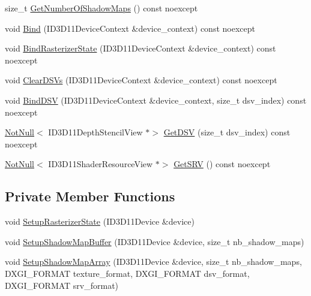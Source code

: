 \begin{DoxyCompactItemize}
size\+\_\+t \hyperlink{classmage_1_1rendering_1_1_shadow_map_buffer_ac0fe3de2d5a4bf147ac2aad969a234aa}{Get\+Number\+Of\+Shadow\+Maps} () const noexcept
\item 
void \hyperlink{classmage_1_1rendering_1_1_shadow_map_buffer_a59fccb2b8261a60c955f81e16d530cda}{Bind} (I\+D3\+D11\+Device\+Context \&device\+\_\+context) const noexcept
\item 
void \hyperlink{classmage_1_1rendering_1_1_shadow_map_buffer_a5216f8d02a3e92a8dcd34dcc6889563c}{Bind\+Rasterizer\+State} (I\+D3\+D11\+Device\+Context \&device\+\_\+context) const noexcept
\item 
void \hyperlink{classmage_1_1rendering_1_1_shadow_map_buffer_a1af9b2bbeaefb1367dbf6c66a2191bcc}{Clear\+D\+S\+Vs} (I\+D3\+D11\+Device\+Context \&device\+\_\+context) const noexcept
\item 
void \hyperlink{classmage_1_1rendering_1_1_shadow_map_buffer_a8aec694d4bc459fefbecb0845c962148}{Bind\+D\+SV} (I\+D3\+D11\+Device\+Context \&device\+\_\+context, size\+\_\+t dsv\+\_\+index) const noexcept
\item 
\hyperlink{namespacemage_a8769f9d670d6b585ea306cb1062af94b}{Not\+Null}$<$ I\+D3\+D11\+Depth\+Stencil\+View $\ast$$>$ \hyperlink{classmage_1_1rendering_1_1_shadow_map_buffer_a3346e66be565ba827d5b4c9b905c4db0}{Get\+D\+SV} (size\+\_\+t dsv\+\_\+index) const noexcept
\item 
\hyperlink{namespacemage_a8769f9d670d6b585ea306cb1062af94b}{Not\+Null}$<$ I\+D3\+D11\+Shader\+Resource\+View $\ast$$>$ \hyperlink{classmage_1_1rendering_1_1_shadow_map_buffer_a22caadf338e87eac69eb9e4297426bf7}{Get\+S\+RV} () const noexcept
\end{DoxyCompactItemize}
\subsection*{Private Member Functions}
\begin{DoxyCompactItemize}
\item 
void \hyperlink{classmage_1_1rendering_1_1_shadow_map_buffer_a04622e03086e5a16783bad043b8754a8}{Setup\+Rasterizer\+State} (I\+D3\+D11\+Device \&device)
\item 
void \hyperlink{classmage_1_1rendering_1_1_shadow_map_buffer_a282239c7ff9ba50246126861d843cf6c}{Setup\+Shadow\+Map\+Buffer} (I\+D3\+D11\+Device \&device, size\+\_\+t nb\+\_\+shadow\+\_\+maps)
\item 
void \hyperlink{classmage_1_1rendering_1_1_shadow_map_buffer_a3efe8318385c4807b1982873afa0e77b}{Setup\+Shadow\+Map\+Array} (I\+D3\+D11\+Device \&device, size\+\_\+t nb\+\_\+shadow\+\_\+maps, D\+X\+G\+I\+\_\+\+F\+O\+R\+M\+AT texture\+\_\+format, D\+X\+G\+I\+\_\+\+F\+O\+R\+M\+AT dsv\+\_\+format, D\+X\+G\+I\+\_\+\+F\+O\+R\+M\+AT srv\+\_\+format)
\end{DoxyCompactItemize}
